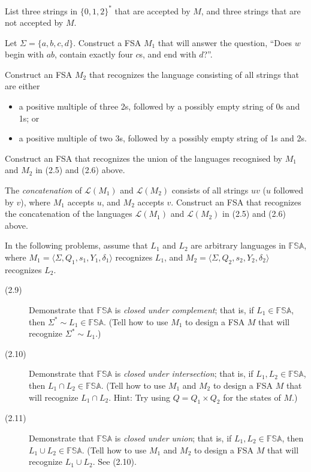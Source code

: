 \documentclass{article}
\newcommand{\El}{\mathcal L}
\begin{document}
\begin{description}
    List three strings in $\{ 0,1,2 \}^*$ that are accepted by $M$, and three strings that are not accepted by $M$.
  \item[(2.5)] Let $\Sigma = \{ a,b,c,d \}$. Construct a FSA $M_1$ that will answer the question, ``Does $w$ begin with $ab$, contain exactly four $c$s, and end with $d$?''.
  \item[(2.6)] Construct an FSA $M_2$ that recognizes the language consisting of all strings that are either
    \begin{itemize}
      \item a positive multiple of three 2s, followed by a possibly empty string of 0s and 1s; or 
      \item a positive multiple of two 3s, followed by a possibly empty string of 1s and 2s.
    \end{itemize}
  \item[(2.7)] Construct an FSA that recognizes the union of the languages recognised by $M_1$ and $M_2$ in (2.5) and (2.6) above.
  \item[(2.8)] The \emph{concatenation} of $\El(M_1)$ and $\El(M_2)$ consists of all strings $uv$ ($u$ followed by $v$), where $M_1$ accepts $u$, and $M_2$ accepts $v$. Construct an FSA that recognizes the concatenation of the languages $\El(M_1)$ and $\El(M_2)$ in (2.5) and (2.6) above.
\end{description}

In the following problems, assume that $L_1$ and $L_2$ are arbitrary languages in $\mathbb{FSA}$, where $M_1 = \langle \Sigma, Q_1, s_1, Y_1, \delta_1 \rangle$ recognizes $L_1$, and $M_2 = \langle \Sigma, Q_2, s_2, Y_2, \delta_2 \rangle$ recognizes $L_2$.

\begin{description}
  \item[(2.9)] Demonstrate that $\mathbb{FSA}$ is \emph{closed under complement}; that is, if $L_1 \in \mathbb{FSA}$, then $\Sigma^* \sim L_1 \in \mathbb{FSA}$. (Tell how to use $M_1$ to design a FSA $M$ that will recognize $\Sigma^* \sim L_1$.)
  \item[(2.10)] Demonstrate that $\mathbb{FSA}$ is \emph{closed under intersection}; that is, if $L_1,L_2 \in \mathbb{FSA}$, then $L_1 \cap L_2 \in \mathbb{FSA}$. (Tell how to use $M_1$ and $M_2$ to design a FSA $M$ that will recognize $L_1 \cap L_2$. Hint: Try using $Q = Q_1 \times Q_2$ for the states of $M$.)
  \item[(2.11)] Demonstrate that $\mathbb{FSA}$ is \emph{closed under union}; that is, if $L_1,L_2 \in \mathbb{FSA}$, then $L_1 \cup L_2 \in \mathbb{FSA}$. (Tell how to use $M_1$ and $M_2$ to design a FSA $M$ that will recognize $L_1 \cup L_2$. See (2.10).
\end{description}
\end{document}
